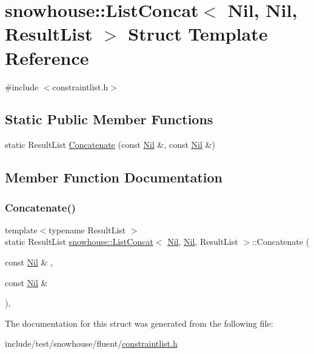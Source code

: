 \hypertarget{structsnowhouse_1_1ListConcat_3_01Nil_00_01Nil_00_01ResultList_01_4}{}\section{snowhouse\+::List\+Concat$<$ Nil, Nil, Result\+List $>$ Struct Template Reference}
\label{structsnowhouse_1_1ListConcat_3_01Nil_00_01Nil_00_01ResultList_01_4}


{\ttfamily \#include $<$constraintlist.\+h$>$}

\subsection*{Static Public Member Functions}
\begin{DoxyCompactItemize}
\item 
static Result\+List \mbox{\hyperlink{structsnowhouse_1_1ListConcat_3_01Nil_00_01Nil_00_01ResultList_01_4_a4d2d6022c6ae4ed19415a9dec2a805ef}{Concatenate}} (const \mbox{\hyperlink{structsnowhouse_1_1Nil}{Nil}} \&, const \mbox{\hyperlink{structsnowhouse_1_1Nil}{Nil}} \&)
\end{DoxyCompactItemize}


\subsection{Member Function Documentation}
\mbox{\label{structsnowhouse_1_1ListConcat_3_01Nil_00_01Nil_00_01ResultList_01_4_a4d2d6022c6ae4ed19415a9dec2a805ef}} 
\subsubsection{\texorpdfstring{Concatenate()}{Concatenate()}}
{\footnotesize\ttfamily template$<$typename Result\+List $>$ \\
static Result\+List \mbox{\hyperlink{structsnowhouse_1_1ListConcat}{snowhouse\+::\+List\+Concat}}$<$ \mbox{\hyperlink{structsnowhouse_1_1Nil}{Nil}}, \mbox{\hyperlink{structsnowhouse_1_1Nil}{Nil}}, Result\+List $>$\+::Concatenate (\begin{DoxyParamCaption}\item[{const \mbox{\hyperlink{structsnowhouse_1_1Nil}{Nil}} \&}]{,  }\item[{const \mbox{\hyperlink{structsnowhouse_1_1Nil}{Nil}} \&}]{ }\end{DoxyParamCaption})\hspace{0.3cm}{\ttfamily [inline]}, {\ttfamily [static]}}



The documentation for this struct was generated from the following file\+:\begin{DoxyCompactItemize}
\item 
include/test/snowhouse/fluent/\mbox{\hyperlink{constraintlist_8h}{constraintlist.\+h}}\end{DoxyCompactItemize}
